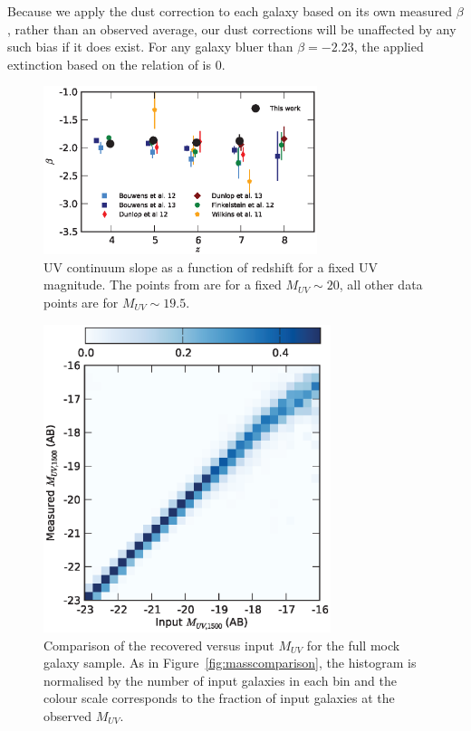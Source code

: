 Because we apply the dust correction to each galaxy based on its own measured $\beta$, rather than an observed average, our dust corrections will be unaffected by any such bias if it does exist. For any galaxy bluer than $\beta = -2.23$, the applied extinction based on the relation of \citet{Meurer:1999jm} is 0.

\begin{figure}
\centering
\includegraphics[width=80mm]{plots/figB3.eps}
\caption{UV continuum slope as a function of redshift for a fixed UV magnitude. The points from \citep{2012ApJ...756..164F} are for a fixed $M_{UV} \sim 20$, all other data points are for $M_{UV} \sim 19.5$.}
\label{fig:beta_z}
\end{figure}



\begin{figure}
\includegraphics[width=84mm]{plots/fig6.eps}
\caption{Comparison of the recovered versus input $M_{UV}$ for the full mock galaxy sample. As in Figure~\ref{fig:masscomparison}, the histogram is normalised by the number of input galaxies in each bin and the colour scale corresponds to the fraction of input galaxies at the observed $M_{UV}$.}
\label{fig:muvcomparison}
\end{figure}

